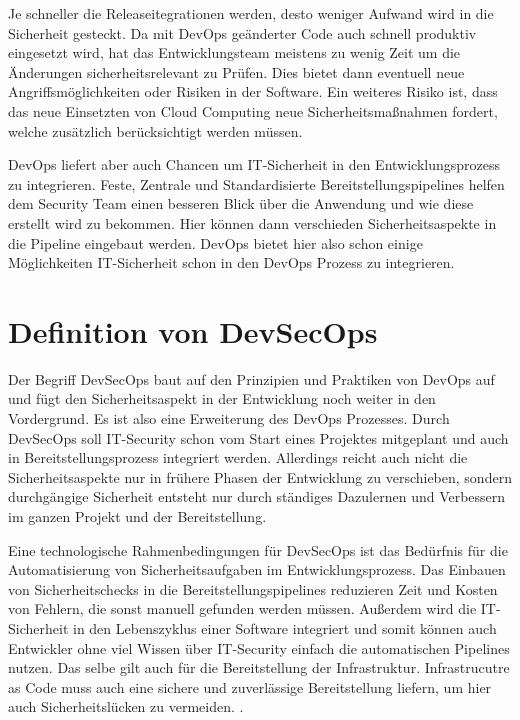 Je schneller die Releaseitegrationen werden, desto weniger Aufwand wird in die Sicherheit gesteckt. Da mit DevOps geänderter Code auch schnell produktiv eingesetzt wird, hat das Entwicklungsteam meistens zu wenig Zeit um die Änderungen sicherheitsrelevant zu Prüfen. Dies bietet dann eventuell neue Angriffsmöglichkeiten oder Risiken in der Software.
Ein weiteres Risiko ist, dass das neue Einsetzten von Cloud Computing neue Sicherheitsmaßnahmen fordert, welche zusätzlich berücksichtigt werden müssen.


DevOps liefert aber auch Chancen um IT-Sicherheit in den Entwicklungsprozess zu integrieren.
Feste, Zentrale und Standardisierte Bereitstellungspipelines helfen dem Security Team einen besseren Blick über die Anwendung und wie diese erstellt wird zu bekommen. Hier können dann verschieden Sicherheitsaspekte in die Pipeline eingebaut werden. DevOps bietet hier also schon einige Möglichkeiten IT-Sicherheit schon in den DevOps Prozess zu integrieren. \cite{grey}

\section{Definition von DevSecOps}
Der Begriff DevSecOps baut auf den Prinzipien und Praktiken von DevOps auf und fügt den Sicherheitsaspekt in der Entwicklung noch weiter in den Vordergrund. Es ist also eine Erweiterung des DevOps Prozesses. Durch DevSecOps soll IT-Security schon vom Start eines Projektes mitgeplant und auch in Bereitstellungsprozess integriert werden. Allerdings reicht auch nicht die Sicherheitsaspekte nur in frühere Phasen der Entwicklung zu verschieben, sondern durchgängige Sicherheit entsteht nur durch ständiges Dazulernen und Verbessern im ganzen Projekt und der Bereitstellung. \cite{grey}

Eine technologische Rahmenbedingungen für DevSecOps ist das Bedürfnis für die Automatisierung von Sicherheitsaufgaben im Entwicklungsprozess. Das Einbauen von Sicherheitschecks in die Bereitstellungspipelines reduzieren Zeit und Kosten von Fehlern, die sonst manuell gefunden werden müssen. Außerdem wird die IT-Sicherheit in den Lebenszyklus einer Software integriert und somit können auch Entwickler ohne viel Wissen über IT-Security einfach die automatischen Pipelines nutzen. Das selbe gilt auch für die Bereitstellung der Infrastruktur. Infrastrucutre as Code muss auch eine sichere und zuverlässige Bereitstellung liefern, um hier auch Sicherheitslücken zu vermeiden. \cite{grey}.

